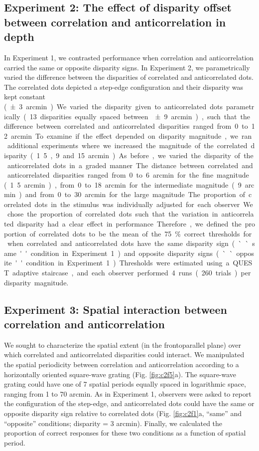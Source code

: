 \subsection{Experiment 2: The effect of disparity offset between correlation and anticorrelation in depth}
In Experiment 1, we contrasted performance when correlation and anticorrelation carried the same or opposite disparity signs. In Experiment 2, we parametrically varied the difference between the disparities of correlated and anticorrelated dots. The correlated dots depicted a step-edge configuration and their disparity was kept constant (\SI{\pm 3} arcmin). We varied the disparity given to anticorrelated dots parametrically (13 disparities equally spaced between \SI{\pm 9} arcmin), such that the difference between correlated and anticorrelated disparities ranged from 0 to 12 arcmin.

To examine if the effect depended on disparity magnitude, we ran additional experiments where we increased the magnitude of the correlated disparity (1.5, 9 and 15 arcmin). As before, we varied the disparity of the anticorrelated dots in a graded manner. The distance between correlated and anticorrelated disparities ranged from 0 to 6 arcmin for the fine magnitude (1.5 arcmin), from 0 to 18 arcmin for the intermediate magnitude (9 arcmin) and from 0 to 30 arcmin for the large magnitude.

The proportion of correlated dots in the stimulus was individually adjusted for each observer. We chose the proportion of correlated dots such that the variation in anticorrelated disparity had a clear effect in performance. Therefore, we defined the proportion of correlated dots to be the mean of the 75\% correct thresholds for when correlated and anticorrelated dots have the same disparity sign (``same'' condition in Experiment 1) and opposite disparity signs (``opposite'' condition in Experiment 1).
Thresholds were estimated using a QUEST adaptive staircase, and each observer performed 4 runs (260 trials) per disparity magnitude.

\subsection{Experiment 3: Spatial interaction between correlation and anticorrelation}
We sought to characterize the spatial extent (in the frontoparallel plane) over which correlated and anticorrelated disparities could interact. We manipulated the spatial periodicity between correlation and anticorrelation according to a horizontally oriented square-wave grating (Fig. \ref{fig:c2f5}a). The square-wave grating could have one of 7 spatial periods equally spaced in logarithmic space, ranging from 1 to 70 arcmin.
As in Experiment 1, observers were asked to report the configuration of the step-edge, and anticorrelated dots could have the same or opposite disparity sign relative to correlated dots (Fig. \ref{fig:c2f1}a, ``same'' and ``opposite'' conditions; disparity =  3 arcmin). Finally, we calculated the proportion of correct responses for these two conditions as a function of spatial period.

